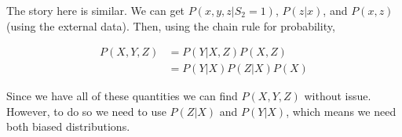 \documentclass[12pt]{article}
\begin{document}
The story here is similar. We can get $P(x,y,z | S_2 = 1)$,  $P(z | x)$, and $P(x,z)$ (using the external data). Then, using the chain rule for probability,

\begin{align*}
P(X,Y,Z) &= P(Y | X, Z) P(X,Z) \\
&= P(Y | X) P(Z | X) P(X) 
\end{align*}

Since we have all of these quantities we can find $P(X,Y,Z)$ without issue. However, to do so we need to use $P(Z | X)$ and $P(Y | X)$, which means we need both biased distributions.
\end{document}
